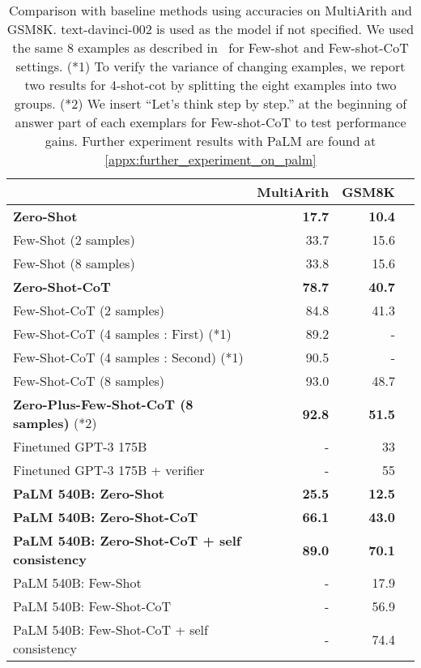 \documentclass{article}
\newcommand{\theirs}{Few-shot-CoT\xspace}
\newcommand{\theirsf}{Few-shot\xspace}
\newcommand{\davinci}{text-davinci-002\xspace}
\begin{document}
\begin{table}[t]\centering
\footnotesize
\caption{Comparison with baseline methods using accuracies on MultiArith and GSM8K. \davinci is used as the model if not specified. We used the same 8 examples as described in~\citep{cot_wei} for \theirsf and \theirs settings. (*1) To verify the variance of changing examples, we report two results for 4-shot-cot by splitting the eight examples into two groups. (*2) We insert ``Let's think step by step.'' at the beginning of answer part of each exemplars for \theirs to test performance gains. Further experiment results with PaLM are found at \autoref{appx:further_experiment_on_palm}}
\label{tab:few_shot}

\begin{tabular}{lrrr}\toprule
&MultiArith &GSM8K \\\midrule
\textbf{Zero-Shot} &\textbf{17.7} &\textbf{10.4} \\
Few-Shot (2 samples) &33.7 &15.6 \\
Few-Shot (8 samples) &33.8 &15.6 \\
\midrule
\textbf{Zero-Shot-CoT} &\textbf{78.7} &\textbf{40.7} \\
Few-Shot-CoT (2 samples) &84.8 &41.3 \\
Few-Shot-CoT (4 samples : First) (*1) &89.2 &- \\
Few-Shot-CoT (4 samples : Second) (*1) &90.5 &- \\
Few-Shot-CoT (8 samples) &93.0 &48.7 \\
\textbf{Zero-Plus-Few-Shot-CoT (8 samples)} (*2) &\textbf{92.8} &\textbf{51.5} \\
\midrule
Finetuned GPT-3 175B \citep{cot_wei} &- &33 \\
Finetuned GPT-3 175B + verifier \citep{cot_wei} &- &55 \\
\midrule
\textbf{PaLM 540B: Zero-Shot} & \textbf{25.5} & \textbf{12.5} \\
\textbf{PaLM 540B: Zero-Shot-CoT} & \textbf{66.1} & \textbf{43.0} \\
\textbf{PaLM 540B: Zero-Shot-CoT + self consistency} & \textbf{89.0} & \textbf{70.1} \\
PaLM 540B: Few-Shot \citep{cot_wei} &- &17.9\\
PaLM 540B: Few-Shot-CoT \citep{cot_wei} &- &56.9\\
PaLM 540B: Few-Shot-CoT + self consistency \citep{cot_wei_sc} &- &74.4\\
\bottomrule
\end{tabular}
\captionsetup{skip=5pt}


\end{table}
\end{document}
